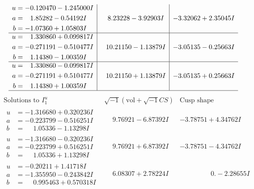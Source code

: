 \documentclass[1p]{elsarticle_modified}
\theoremstyle{definition}
\newcommand{\I}{\sqrt{-1}}
\begin{document}
$$\begin{array}{c|c|c}
\begin{aligned}
u &= -0.120470 - 1.245000 I \\
a &= \phantom{-}1.85282 - 0.54192 I \\
b &= -1.07360 + 1.05803 I\end{aligned}
 & \phantom{-}8.23228 - 3.92903 I & -3.32062 + 2.35045 I \\ \hline\begin{aligned}
u &= \phantom{-}1.330860 + 0.099817 I \\
a &= -0.271191 - 0.510477 I \\
b &= \phantom{-}1.14380 - 1.00359 I\end{aligned}
 & \phantom{-}10.21150 - 1.13879 I & -3.05135 - 0.25663 I \\ \hline\begin{aligned}
u &= \phantom{-}1.330860 - 0.099817 I \\
a &= -0.271191 + 0.510477 I \\
b &= \phantom{-}1.14380 + 1.00359 I\end{aligned}
 & \phantom{-}10.21150 + 1.13879 I & -3.05135 + 0.25663 I\\
 \hline 
 \end{array}$$\newpage$$\begin{array}{c|c|c}  
\text{Solutions to }I^u_{1}& \I (\text{vol} + \sqrt{-1}CS) & \text{Cusp shape}\\
 \hline 
\begin{aligned}
u &= -1.316680 + 0.320236 I \\
a &= -0.223799 - 0.516251 I \\
b &= \phantom{-}1.05336 - 1.13298 I\end{aligned}
 & \phantom{-}9.76921 - 6.87392 I & -3.78751 + 4.34762 I \\ \hline\begin{aligned}
u &= -1.316680 - 0.320236 I \\
a &= -0.223799 + 0.516251 I \\
b &= \phantom{-}1.05336 + 1.13298 I\end{aligned}
 & \phantom{-}9.76921 + 6.87392 I & -3.78751 - 4.34762 I \\ \hline\begin{aligned}
u &= -0.20211 + 1.41718 I \\
a &= -1.355950 - 0.243842 I \\
b &= \phantom{-}0.995463 + 0.570318 I\end{aligned}
 & \phantom{-}6.08307 + 2.78224 I & \phantom{-0.000000 } 0. - 2.28655 I \\ \hline\begin{aligned}

\end{aligned}
\end{array}$$
\end{document}

